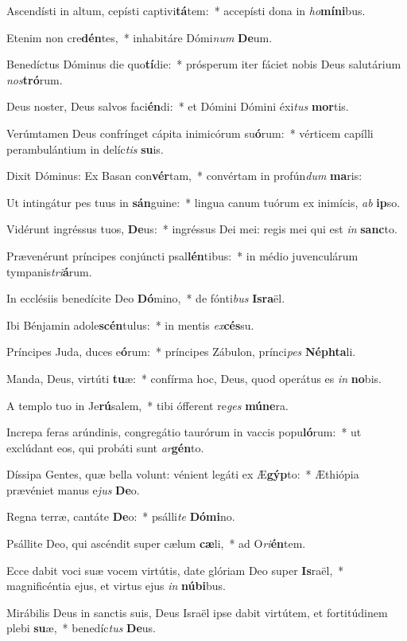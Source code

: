 \item Ascendísti in altum, cepísti captivi\textbf{tá}tem:~* accepísti dona in \textit{ho}\textbf{mí}\textbf{ni}bus.
\item Etenim non cre\textbf{dén}tes,~* inhabitáre Dómi\textit{num} \textbf{De}um.
\item Benedíctus Dóminus die quo\textbf{tí}die:~* prósperum iter fáciet nobis Deus salutárium \textit{nos}\textbf{tró}rum.
\item Deus noster, Deus salvos faci\textbf{én}di:~* et Dómini Dómini éxi\textit{tus} \textbf{mor}tis.
\item Verúmtamen Deus confrínget cápita inimicórum su\textbf{ó}rum:~* vérticem capílli perambulántium in delíc\textit{tis} \textbf{su}is.
\item Dixit Dóminus: Ex Basan con\textbf{vér}tam,~* convértam in profún\textit{dum} \textbf{ma}ris:
\item Ut intingátur pes tuus in \textbf{sán}guine:~* lingua canum tuórum ex inimícis, \textit{ab} \textbf{ip}so.
\item Vidérunt ingréssus tuos, \textbf{De}us:~* ingréssus Dei mei: regis mei qui est \textit{in} \textbf{sanc}to.
\item Prævenérunt príncipes conjúncti psal\textbf{lén}tibus:~* in médio juvenculárum tympanis\textit{tri}\textbf{á}rum.
\item In ecclésiis benedícite Deo \textbf{Dó}mino,~* de fónti\textit{bus} \textbf{Is}\textbf{ra}ël.
\item Ibi Bénjamin adole\textbf{scén}tulus:~* in mentis \textit{ex}\textbf{cés}su.
\item Príncipes Juda, duces e\textbf{ó}rum:~* príncipes Zábulon, prínci\textit{pes} \textbf{Néph}\textbf{ta}li.
\item Manda, Deus, virtúti \textbf{tu}æ:~* confírma hoc, Deus, quod operátus es \textit{in} \textbf{no}bis.
\item A templo tuo in Je\textbf{rú}salem,~* tibi ófferent re\textit{ges} \textbf{mú}\textbf{ne}ra.
\item Increpa feras arúndinis, congregátio taurórum in vaccis popu\textbf{ló}rum:~* ut exclúdant eos, qui probáti sunt \textit{ar}\textbf{gén}to.
\item Díssipa Gentes, quæ bella volunt: vénient legáti ex Æ\textbf{gýp}to:~* Æthiópia prævéniet manus e\textit{jus} \textbf{De}o.
\item Regna terræ, cantáte \textbf{De}o:~* psálli\textit{te} \textbf{Dó}\textbf{mi}no.
\item Psállite Deo, qui ascéndit super cælum \textbf{cæ}li,~* ad O\textit{ri}\textbf{én}tem.
\item Ecce dabit voci suæ vocem virtútis, date glóriam Deo super \textbf{Is}raël,~* magnificéntia ejus, et virtus ejus \textit{in} \textbf{nú}\textbf{bi}bus.
\item Mirábilis Deus in sanctis suis, Deus Israël ipse dabit virtútem, et fortitúdinem plebi \textbf{su}æ,~* benedíc\textit{tus} \textbf{De}us.
